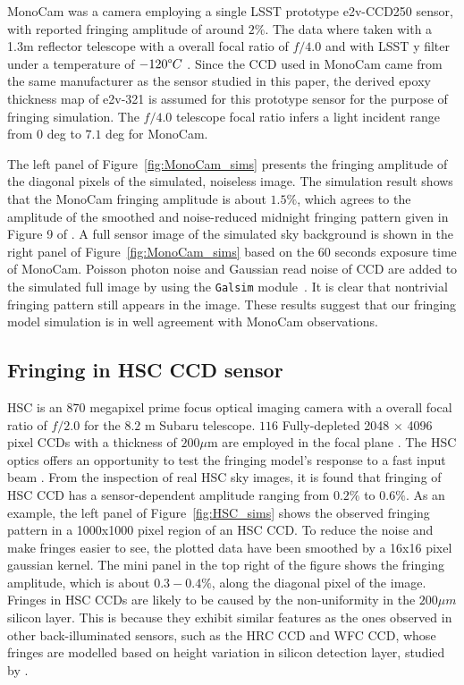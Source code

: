 \documentclass[twocolumn]{aastex63} %
\begin{document}
\begin{CJK*}{UTF8}{gbsn}
MonoCam was a camera employing a single LSST prototype e2v-CCD250 sensor, with reported fringing amplitude of around $2\%$. The data where taken with a 1.3m reflector telescope with a overall focal ratio of $f/4.0$ and with LSST y filter under a temperature of $-120\degree C$ \citep{Brooks17}. Since the CCD used in MonoCam came from the same manufacturer as the sensor studied in this paper, the derived epoxy thickness map of e2v-321 is assumed for this prototype sensor for the purpose of fringing simulation. The $f/4.0$ telescope focal ratio infers a light incident range from $0$ deg to $7.1$ deg for MonoCam.

The left panel of Figure~\ref{fig:MonoCam_sims} presents the fringing amplitude of the diagonal pixels of the simulated, noiseless image. The simulation result shows that the MonoCam fringing amplitude is about $1.5\%$, which agrees to the amplitude of the smoothed and noise-reduced midnight fringing pattern given in Figure 9 of \citet{Brooks17}. A full sensor image of the simulated sky background is shown in the right panel of Figure~\ref{fig:MonoCam_sims} based on the $60$ seconds exposure time \citep{Brooks17} of MonoCam. Poisson photon noise and Gaussian read noise of CCD are added to the simulated full image by using the \verb|Galsim| module~\citep{Galsim}. It is clear that nontrivial fringing pattern still appears in the image. These results suggest that our fringing model simulation is in well agreement with MonoCam observations.

\subsection{Fringing in HSC CCD sensor}

HSC is an $870$ megapixel prime focus optical imaging camera with a overall focal ratio of $f/2.0$ for the $8.2$ m Subaru telescope. $116$ Fully-depleted  2048 × 4096 pixel CCDs with a thickness of $200\mu$m are employed in the focal plane \citep{Miyazaki18}. The HSC optics offers an opportunity to test the fringing model's response to a fast input beam . From the inspection of real HSC sky images, it is found that fringing of HSC CCD has a sensor-dependent amplitude ranging from $0.2\%$ to $0.6\%$. As an example, the left panel of Figure~\ref{fig:HSC_sims} shows the observed fringing pattern in a 1000x1000 pixel region of an HSC CCD. To reduce the noise and make fringes easier to see, the plotted data have been smoothed by a 16x16 pixel gaussian kernel. The mini panel in the top right of the figure shows the fringing amplitude, which is about $0.3-0.4\%$, along the diagonal pixel of the image. Fringes in HSC CCDs are likely to be caused by the non-uniformity in the $200\mu m$ silicon layer. This is because they exhibit similar features as the ones observed in other back-illuminated sensors, such as the HRC CCD and WFC CCD, whose fringes are modelled based on height variation in silicon detection layer, studied by \citet{Walsh03}. 


\end{CJK*}
\end{document}
